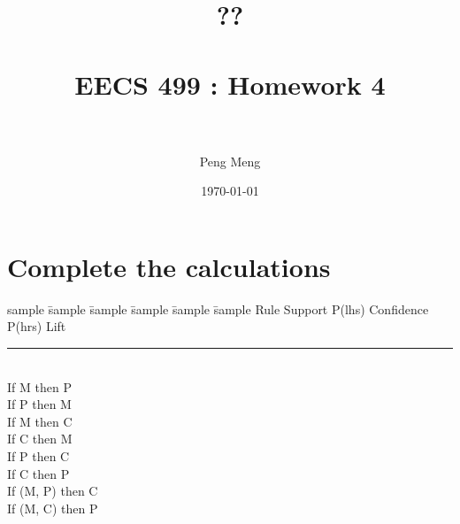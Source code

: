 \documentclass[letterpaper, 11pt]{scrartcl} %
\title{	
\normalfont \normalsize 
\textsc{\UTF{6D4B}\UTF{8BD5}??} \\ [10pt] %
\horrule{0.5pt} \\[0.2cm] %
\huge EECS 499 : Homework 4 \\ %
\horrule{0.5pt} \\[0.2cm] %
}
\author{Peng Meng} %
\date{\normalsize\today} %
\numberwithin{equation}{section} %
\numberwithin{figure}{section} %
\numberwithin{table}{section} %
\begin{document}
\maketitle %


\section{Complete the calculations}
\begin{tabbing}
sample \hspace{4em} \= sample \hspace{2em} \= sample \hspace{2em} \= sample \hspace{4em} \= sample \hspace{2em} \= sample \kill
Rule \> Support \> P(lhs) \> Confidence \> P(hrs) \> Lift \\
\rule{36em}{0.5pt} \\
If M then P      \\
If P then M      \\
If M then C      \\
If C then M      \\
If P then C      \\
If C then P     \\
If (M, P) then C      \\
If (M, C) then P     \\
\end{tabbing}


\end{document}
